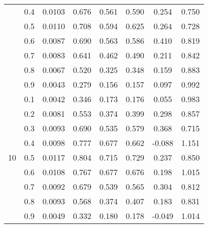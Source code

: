 \documentclass[11pt,a4paper]{report}
\begin{document}
\begin{longtable}{ | c | c || c | c | c | c | c | c | }
 & 0.4 & 0.0103 & 0.676 & 0.561 & 0.590 & 0.254 & 0.750 \\
 & 0.5 & 0.0110 & 0.708 & 0.594 & 0.625 & 0.264 & 0.728 \\
 & 0.6 & 0.0087 & 0.690 & 0.563 & 0.586 & 0.410 & 0.819 \\
 & 0.7 & 0.0083 & 0.641 & 0.462 & 0.490 & 0.211 & 0.842 \\
 & 0.8 & 0.0067 & 0.520 & 0.325 & 0.348 & 0.159 & 0.883 \\
 & 0.9 & 0.0043 & 0.279 & 0.156 & 0.157 & 0.097 & 0.992 \\
 \hline
\multirow{9}{*}{10} & 0.1 & 0.0042 & 0.346 & 0.173 & 0.176 & 0.055 & 0.983 \\
 & 0.2 & 0.0081 & 0.553 & 0.374 & 0.399 & 0.298 & 0.857 \\
 & 0.3 & 0.0093 & 0.690 & 0.535 & 0.579 & 0.368 & 0.715 \\
 & 0.4 & 0.0098 & 0.777 & 0.677 & 0.662 & -0.088 & 1.151 \\
 & 0.5 & 0.0117 & 0.804 & 0.715 & 0.729 & 0.237 & 0.850 \\
 & 0.6 & 0.0108 & 0.767 & 0.677 & 0.676 & 0.198 & 1.015 \\
 & 0.7 & 0.0092 & 0.679 & 0.539 & 0.565 & 0.304 & 0.812 \\
 & 0.8 & 0.0093 & 0.568 & 0.374 & 0.407 & 0.183 & 0.831 \\
 & 0.9 & 0.0049 & 0.332 & 0.180 & 0.178 & -0.049 & 1.014 \\
 \hline
\hline
\end{longtable}
\end{document}
